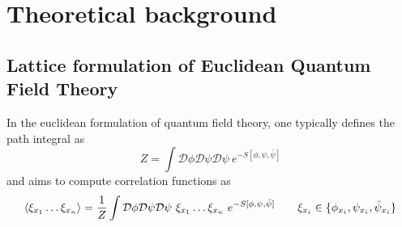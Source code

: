 \chapter{Theoretical background}
\label{chap:theoretical_background}

\section{Lattice formulation of Euclidean Quantum Field Theory}
\label{sec:lattice_formulation}
In the euclidean formulation of quantum field theory, one typically defines the path integral as 
\begin{equation}
    Z = \int \mathcal{D}\phi\mathcal{D}\psi\mathcal{D}\psi \ e^{-S[\phi, \psi, \bar\psi]}
    \label{eq:path_integral_generic}
\end{equation}
and aims to compute correlation functions as
\begin{equation*}
        \left\langle \xi_{x_1} \dots \xi_{x_n}  \right\rangle = \frac{1}{Z} \int \mathcal{D}\phi\mathcal{D}\psi\mathcal{D}\psi \ \xi_{x_1} \dots \xi_{x_n} \ e^{-S[\phi, \psi, \bar\psi]} \qquad \xi_{x_i} \in \{\phi_{x_i}, \psi_{x_i}, \bar\psi_{x_i}\} \\
\end{equation*}

